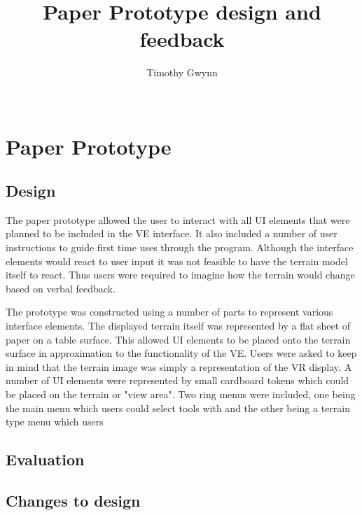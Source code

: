 \documentclass{sig-alternate-05-2015}
\begin{document}
\title{Paper Prototype design and feedback}

\author{
\alignauthor
Timothy Gwynn\\
       \\
}
\maketitle
\begin{CCSXML}

\end{CCSXML}



\printccsdesc
\section{Paper Prototype}
\subsection{Design}
The paper prototype allowed the user to interact with all UI elements that were planned to be included in the VE interface. It also included a number of user instructions to guide first time uses through the program. Although the interface elements would react to user input it was not feasible to have the terrain model itself to react. Thus users were required to imagine how the terrain would change based on verbal feedback.

The prototype was constructed using a number of parts to represent various interface elements. The displayed terrain itself was represented by a flat sheet of paper on a table surface. This allowed UI elements to be placed onto the terrain surface in approximation to the functionality of the VE. Users were asked to keep in mind that the terrain image was simply a representation of the VR display. A number of UI elements were represented by small cardboard tokens which could be placed on the terrain or "view area". Two ring menus were included, one being the main menu which users could select tools with and the other being a terrain type menu which users
\subsection{Evaluation}
\subsection{Changes to design}
\end{document}

